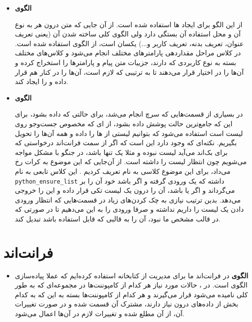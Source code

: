 \begin{itemize}
	\item
	\textbf{الگوی }
	
	از این الگو برای ایجاد  ها استفاده شده است. از آن جایی که متن درون هر  به نوع آن  و محل استفاده آن بستگی دارد ولی الگوی کلی ساخته شدن آن (یعنی تعریف عنوان، تعریف بدنه، تعریف کاربر و...) یکسان است، از الگوی  استفاده شده است. در کلاس  مراحل مقداردهی پارامترهای مختلف  انجام می‌شود و کلاس‌های مختلف  بسته به نوع کاربردی که دارند، جزییات متن پیام و پارامترها را استخراج کرده و آن‌‌ها را در اختیار  قرار می‌دهند تا به ترتیبی که لازم است، آن‌ها را در کنار هم قرار داده و  را ایجاد کند.
	
	
	\item
	\textbf{الگوی }
	
	در بسیاری از قسمت‌هایی که سرچ انجام می‌شد، برای حالتی که  داده بشود، برای این که جامع‌ترین حالت پوشش داده بشود، از  ای که مخصوص جست‌وجو روی لیست است استفاده می‌شود که بتوانیم لیستی از  ها را داده و همه آن‌ها را تحویل بگیریم. نکته‌ای که وجود دارد این است که اگر از سمت فرانت‌اند درخواستی که برای بک‌اند می‌آید لیست نبوده و مثلا یک  تنها باشد، در  جنگو با مشکل مواجه می‌شویم چون انتظار لیست را داشته است. از آن‌جایی که این موضوع به کرات رخ می‌داد، برای این موضوع کلاسی به نام  تعریف کردیم . این کلاس تابعی به نام \verb+python_ensure_list+  داشته که یک ورودی گرفته و اگر  باشد خود آن را بر می‌گرداند و اگر  یا  باشد، آن‌ را درون یک لیست تکی قرار داده و این  را خروجی می‌دهد. بدین ترتیب نیازی به چک کردن‌های زیاد در قسمت‌هایی که انتظار ورودی دادن یک لیست را داریم نداشته و صرفا ورودی را به این  می‌دهیم تا در صورتی که در قالب مشخص ما نبود، آن را به قالبی که قابل استفاده باشد تبدیل کند.
	
	
	
\end{itemize}

\newpage

\section{فرانت‌اند}
\label{designpattern:front}


\begin{itemize}
	\item 
	\textbf{الگوی }
	در فرانت‌اند ما برای مدیریت  از کتابخانه  استفاده کرده‌ایم که عملا پیاده‌سازی‌ الگوی  است. در ، حالات مورد نیاز هر کدام از کامپوننت‌ها در مجموعه‌ای که به طور کلی  نامیده می‌شود قرار می‌گیرند و هر کدام از کامپوننت‌ها بسته به این که به کدام بخش از داده‌های درون  نیاز دارند، مشترک آن قسمت شده و در صورت تغییرات آن، از آن مطلع شده و تغییرات لازم در آن‌ها اعمال می‌شود.
	
	 
\end{itemize}
